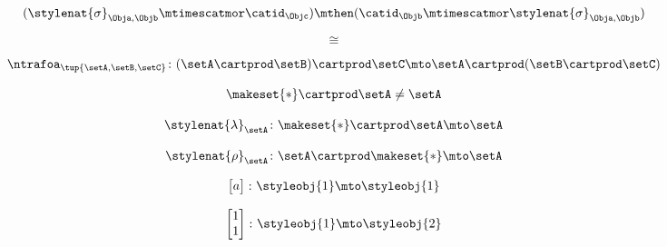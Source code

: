{\begin{forslides}
        \begin{equation}
            \label{eq:parallelism-104}
            (\stylenat{\sigma}_{\Obja, \Objb} \mtimescatmor \catid_\Objc) \mthen (\catid_\Objb \mtimescatmor \stylenat{\sigma}_{\Obja, \Objb})
        \end{equation}

        \begin{equation}
            \label{eq:parallelism-105}
            \cong
        \end{equation}

        \begin{equation}
            \label{eq:parallelism-106}
            \ntrafoa_{\tup{\setA, \setB, \setC}} \colon (\setA \cartprod \setB) \cartprod \setC  \mto  \setA \cartprod (\setB \cartprod \setC)
        \end{equation}

        \begin{equation}
            \label{eq:parallelism-107}
            \makeset{ * } \cartprod \setA  \neq \setA
        \end{equation}

        \begin{equation}
            \label{eq:parallelism-108}
            \stylenat{\lambda}_\setA \colon \makeset{ * } \cartprod \setA \mto \setA
        \end{equation}

        \begin{equation}
            \label{eq:parallelism-109}
            \stylenat{\rho}_\setA \colon \setA  \cartprod \makeset{ * } \mto \setA
        \end{equation}

        \begin{equation}
            \label{eq:parallelism-110}
            \begin{bmatrix}
                a
            \end{bmatrix}
            \colon \styleobj{1} \mto \styleobj{1}
        \end{equation}

        \begin{equation}
            \label{eq:parallelism-111}
            \begin{bmatrix}
                1 \\
                1
            \end{bmatrix}
            \colon \styleobj{1} \mto \styleobj{2}
        \end{equation}


\end{forslides}}
